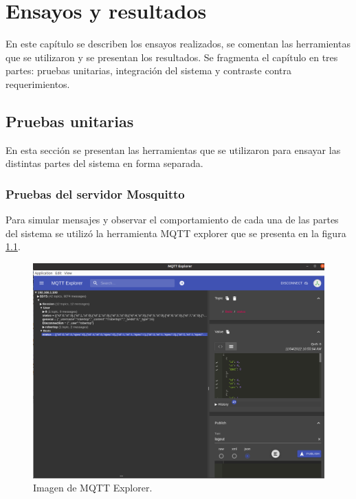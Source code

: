 
\chapter{Ensayos y resultados} %
\label{Chapter4} %

En este capítulo se describen los ensayos realizados, se comentan las herramientas que se utilizaron y se presentan los resultados. Se fragmenta el capítulo en tres partes: pruebas unitarias, integración del sistema y contraste contra requerimientos.



\section{Pruebas unitarias}
En esta sección se presentan las herramientas que se utilizaron para ensayar las distintas partes del sistema en forma separada.

\subsection{Pruebas del servidor Mosquitto}
Para simular mensajes y observar el comportamiento de cada una de las partes del sistema se utilizó la herramienta MQTT explorer   \citep{WEBSITE:29} que se presenta en la figura \ref{fig:MQTT Explorer}.

\begin{figure}[ht]
	\centering
	\includegraphics[scale=.30]{./Figures/mqtt-explorer.png}
	\caption{Imagen de MQTT Explorer.}
	\label{fig:MQTT Explorer}
\end{figure}


